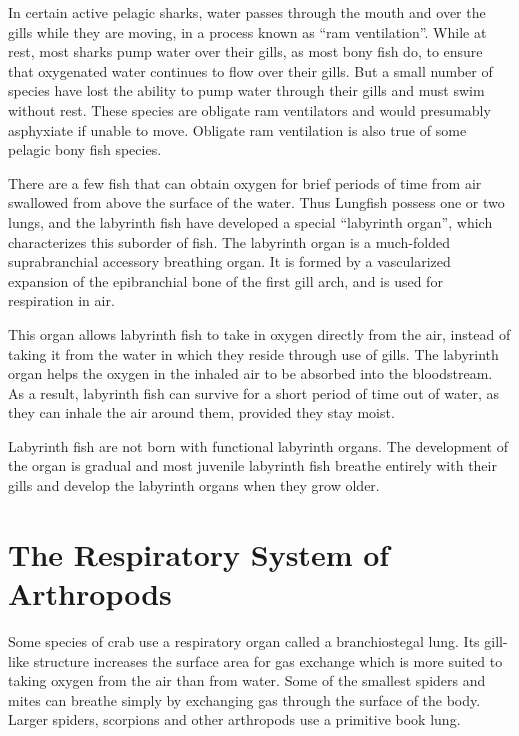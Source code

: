 In certain active pelagic sharks, water passes through the mouth and over the gills while they are moving, in a process known as ``ram ventilation''. While at rest, most sharks pump water over their gills, as most bony fish do, to ensure that oxygenated water continues to flow over their gills. But a small number of species have lost the ability to pump water through their gills and must swim without rest. These species are obligate ram ventilators and would presumably asphyxiate if unable to move. Obligate ram ventilation is also true of some pelagic bony fish species.

There are a few fish that can obtain oxygen for brief periods of time from air swallowed from above the surface of the water. Thus Lungfish possess one or two lungs, and the labyrinth fish have developed a special ``labyrinth organ'', which characterizes this suborder of fish. The labyrinth organ is a much-folded suprabranchial accessory breathing organ. It is formed by a vascularized expansion of the epibranchial bone of the first gill arch, and is used for respiration in air.

This organ allows labyrinth fish to take in oxygen directly from the air, instead of taking it from the water in which they reside through use of gills. The labyrinth organ helps the oxygen in the inhaled air to be absorbed into the bloodstream. As a result, labyrinth fish can survive for a short period of time out of water, as they can inhale the air around them, provided they stay moist.

Labyrinth fish are not born with functional labyrinth organs. The development of the organ is gradual and most juvenile labyrinth fish breathe entirely with their gills and develop the labyrinth organs when they grow older.

\hypertarget{the-respiratory-system-of-arthropods}{%
\section{The Respiratory System of Arthropods}\label{the-respiratory-system-of-arthropods}}

Some species of crab use a respiratory organ called a branchiostegal lung. Its gill-like structure increases the surface area for gas exchange which is more suited to taking oxygen from the air than from water. Some of the smallest spiders and mites can breathe simply by exchanging gas through the surface of the body. Larger spiders, scorpions and other arthropods use a primitive book lung.



